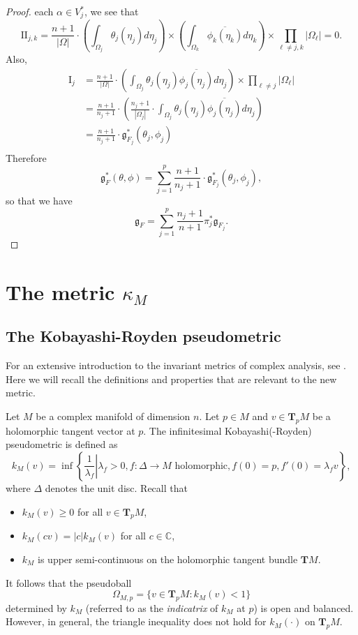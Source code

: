 \documentclass[a4paper,11pt,reqno]{amsart}
\theoremstyle{plain}
\theoremstyle{definition}
\theoremstyle{remark}
\theoremstyle{remark}
\numberwithin{equation}{section}
\newcommand{\abs}[1]{\left\vert#1\right\vert}
\newcommand{\ol}{\overline}
\newcommand{\g}{\mathfrak{g}}
\begin{document}
\begin{proof}
each $\alpha\in V_j^*$, we see that 
\[ \mathrm{II}_{j,k}= \frac{n+1}{\abs{\Omega}}\cdot \left(\int_{\Omega_j}\theta_j(\eta_j)d\eta_j\right)\times \left(\int_{\Omega_k}\ol{\phi_k(\eta_k)}d\eta_k \right)\times \prod_{\ell\not=j,k} \abs{\Omega_\ell}=0.\]
Also,
\begin{align*}
    \mathrm{I}_j&= \frac{n+1}{\abs{\Omega}}\cdot \left(\int_{\Omega_j}\theta_j(\eta_j)\ol{\phi_j(\eta_j) }d\eta_j\right)\times \prod_{\ell\not=j} \abs{\Omega_\ell}\\
    &= \frac{n+1}{n_j+1}\cdot\left(\frac{n_j+1}{\abs{\Omega_j}}\cdot \int_{\Omega_j}\theta_j(\eta_j)\ol{\phi_j(\eta_j) }d\eta_j \right)\\
    &=\frac{n+1}{n_j+1}\cdot \g_{F_j}^*(\theta_j,\phi_j)\\
    \end{align*}
Therefore
\[  \g_F^*(\theta, \phi)= \sum_{j=1}^p \frac{n+1}{n_j+1}\cdot \g_{F_j}^*(\theta_j,\phi_j),\]
so that  we have
\[ \g_F= \sum_{j=1}^p\frac{n_j+1}{n+1} \pi_j^*\g_{F_j}. \] 
\end{proof}   

\section{The metric $\kappa_M$} 
\subsection{The Kobayashi-Royden pseudometric} For an extensive introduction to the invariant metrics of complex analysis, see \cite{mahabharata}. Here we will
recall the definitions and properties that are relevant to the new metric. 

Let $ M $ be a complex manifold of dimension $ n $. Let $ p \in M $ and $ v \in \textbf{T}_p M $ be a holomorphic tangent vector at $ p $. The infinitesimal Kobayashi(-Royden) pseudometric is defined as
\[
k_M(v) = \inf\left\{ \left.\frac{1}{\lambda_f}\right| \lambda_f>0, f:\Delta \to M \text{ holomorphic}, f(0)=p, f'(0)=\lambda_f v \right\},
\]
where $\Delta$ denotes the unit disc. 
Recall that
\begin{itemize}
 \item $ k_M(v) \geq 0 $ for all $ v \in \textbf{T}_p M$,
 \item $ k_M (c v) = |c| k_M(v) $ for all $ c \in \mathbb{C} $,
 \item $ k_M $ is upper semi-continuous on the holomorphic tangent bundle $ \textbf{T} M $.
\end{itemize}
It follows that the pseudoball 
\begin{equation} \label{Kob-indica}
\Omega_{M,p} = \{ v \in \textbf{T}_p M: k_M(v) < 1 \}
\end{equation} 
determined by $ k_M $ (referred to as the \textit{indicatrix} of $ k_M $ at $ p $) is open and balanced. However, in general, the triangle inequality does not hold for $ k_M (\cdot) $ on $ \textbf{T}_p M $.
\end{document}
